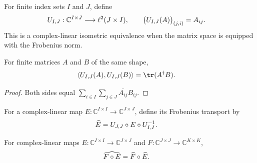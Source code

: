 \begin{definition}
    \label{def:frobenius_vectorization}
    \leanok
    For finite index sets $I$ and $J$, define
    \begin{align}
        U_{I,J}&:\mathbb C^{I\times J}\longrightarrow\ell^2(J\times I),
        \qquad
        \bigl(U_{I,J}(A)\bigr)_{(j,i)}=A_{ij}.
        \notag
    \end{align}
    This is a complex-linear isometric equivalence when the matrix space is
    equipped with the Frobenius norm.
\end{definition}

\begin{lemma}
    \label{lem:frobenius_vectorization_inner}
    \leanok
    For finite matrices $A$ and $B$ of the same shape,
    \begin{align}
        \left\langle U_{I,J}(A),U_{I,J}(B)\right\rangle
        &=\tr(A^\dagger B).
        \notag
    \end{align}
\end{lemma}

\begin{proof}
    \leanok
    Both sides equal
    $\sum_{i\in I}\sum_{j\in J}\overline{A_{ij}}B_{ij}$.
\end{proof}

\begin{definition}
    \label{def:frobenius_superoperator_transport}
    \leanok
    For a complex-linear map
    $E:\mathbb C^{I\times I}\to\mathbb C^{J\times J}$, define its Frobenius
    transport by
    \begin{align}
        \widehat E
        &=U_{J,J}\circ E\circ U_{I,I}^{-1}.
        \notag
    \end{align}
\end{definition}

\begin{theorem}
    \label{thm:frobenius_superoperator_transport_comp}
    \leanok
    For complex-linear maps
    $E:\mathbb C^{I\times I}\to\mathbb C^{J\times J}$ and
    $F:\mathbb C^{J\times J}\to\mathbb C^{K\times K}$,
    \begin{align}
        \widehat{F\circ E}
        &=\widehat F\circ\widehat E.
        \notag
    \end{align}
\end{theorem}

